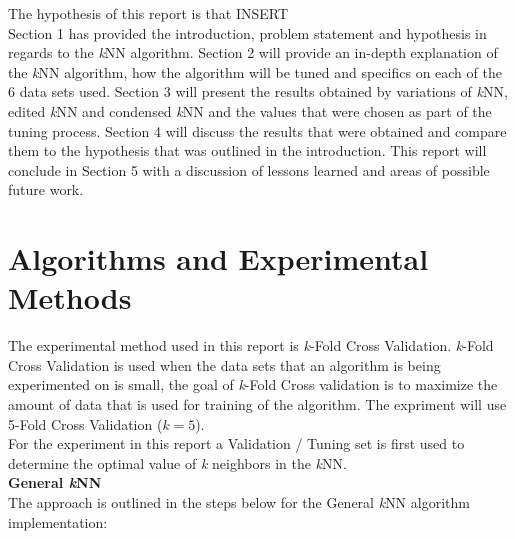 \documentclass[twoside,11pt]{article}
\begin{document}
\hspace*{10mm} The hypothesis of this report is that INSERT\\

\hspace*{10mm} Section 1 has provided the introduction, problem statement and hypothesis in regards to the \textit{k}NN algorithm. Section 2 will provide an in-depth explanation of the \textit{k}NN algorithm, how the algorithm will be tuned and specifics on each of the 6 data sets used. Section 3 will present the results obtained by variations of \textit{k}NN, edited \textit{k}NN and condensed \textit{k}NN and the values that were chosen as part of the tuning process. Section 4 will discuss the results that were obtained and compare them to the hypothesis that was outlined in the introduction. This report will conclude in Section 5 with a discussion of lessons learned and areas of possible future work.\newline



\section{Algorithms and Experimental Methods}
The experimental method used in this report is \textit{k}-Fold Cross Validation. \textit{k}-Fold Cross Validation is used when the data sets that an algorithm is being experimented on is small, the goal of \textit{k}-Fold Cross validation is to maximize the amount of data that is used for training of the algorithm. The expriment will use 5-Fold Cross Validation ($\textit{k} = 5$).\\ 
For the experiment in this report a Validation / Tuning set is first used to determine the optimal value of \textit{k} neighbors in the \textit{k}NN.\\ 

\textbf{General \textit{k}NN}\\
\hspace*{10mm} The approach is outlined in the steps below for the General \textit{k}NN algorithm implementation:
\end{document}
